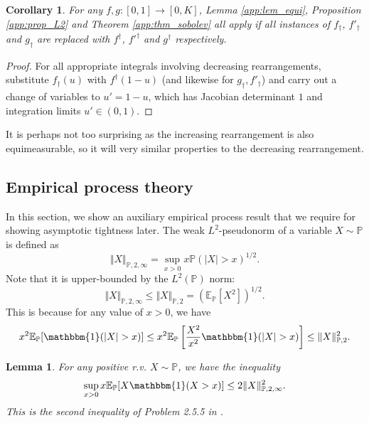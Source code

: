 \documentclass[11pt,a4paper]{article}
\newtheorem{lem}{Lemma}
\newtheorem{cor}{Corollary}
\newcommand{\E}{\mathbb{E}}
\renewcommand{\Pr}{\mathbb{P}}
\begin{document}
\begin{appendices}
\begin{cor}
    For any $f,g:[0,1] \to [0,K]$, {Lemma \ref{app:lem_equi}}, {Proposition \ref{app:prop_L2}} and {Theorem \ref{app:thm_sobolev}} all apply if all instances of $f_{\dagger}$, $f'_{\dagger}$ and $g_{\dagger}$ are replaced with $f^{\dagger}$, ${f'}^{\dagger}$ and $g^{\dagger}$ respectively.
\end{cor}
\begin{proof}
    For all appropriate integrals involving decreasing rearrangements, substitute $f_{\dagger}(u)$ with $f^{\dagger}(1-u)$ (and likewise for $g_{\dagger}, f'_{\dagger}$) and carry out a change of variables to $u' = 1-u$, which has Jacobian determinant $1$ and integration limits $u' \in (0,1)$. 
\end{proof}
It is perhaps not too surprising as the increasing rearrangement is also equimeasurable, so it will very similar properties to the decreasing rearrangement. 




\subsection{Empirical process theory}\label{sec:emp}
In this section, we show an auxiliary empirical process result that we require for showing asymptotic tightness later.
The weak $L^{2}$-pseudonorm of a variable $X \sim \Pr$ is defined as
\begin{equation*}
    \Vert X \Vert_{\Pr,2,\infty} = \sup_{x > 0} x \Pr(|X| > x)^{1/2}.
\end{equation*}
Note that it is upper-bounded by the $L^{2}(\Pr)$ norm:
\begin{equation*}
    \Vert X \Vert_{\Pr,2,\infty} \leq \Vert X \Vert_{\Pr,2} = (\E_{\Pr}[X^{2}])^{1/2}.
\end{equation*}
This is because for any value of $x > 0$, we have
\begin{equation*}
    x^{2}\E_{\Pr}[\mathbbm{1}(|X| > x)] \leq x^{2}\E_{\Pr}\left[\frac{X^{2}}{x^{2}}\mathbbm{1}(|X| > x)\right] \leq \Vert X \Vert_{\Pr,2}^{2}.
\end{equation*}

\begin{lem} \label{lem::prob2.5.5}
    For any positive r.v. $X \sim \Pr$, we have the inequality
    \begin{equation*}
        \sup_{x>0} x\E_{\Pr}[X\mathbbm{1}(X > x)] \leq 2 \Vert X \Vert_{\Pr,2,\infty}^{2}.
    \end{equation*}
    This is the second inequality of Problem 2.5.5 in \cite{vanderVaart2023}.
\end{lem}


\end{appendices}
\end{document}
